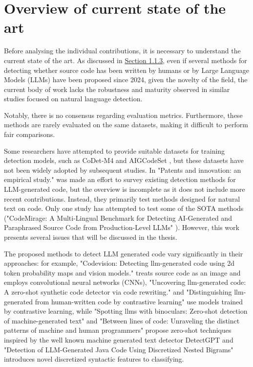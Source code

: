 \clearpage

\chapter{Overview of current state of the art}

Before analysing the individual contributions, 
it is necessary to understand the current state 
of the art. As discussed in
\hyperref[sec:Challenges in LLM-Generated Code Detection]{Section 1.1.3}, 
even if several methods for detecting whether source code has been written 
by humans or by Large Language Models (LLMs) have been proposed since 2024, 
given the novelty of the field, the current body of work lacks the 
robustness and maturity observed in similar studies focused on natural 
language detection. 

Notably, there is no consensus regarding evaluation 
metrics. Furthermore, these methods are rarely evaluated on the same datasets, 
making it difficult to perform fair comparisons.

Some researchers have attempted to provide suitable datasets for training 
detection models, such as CoDet-M4 \cite{orel2025codet,} and 
AIGCodeSet \cite{demirok2024aigcodeset}, but 
these datasets have not been widely adopted by subsequent studies. 
In "Patents and innovation: an empirical study." \cite{suh2024empirical} 
was made an effort to survey existing detection methods for 
LLM-generated code, but the overview is incomplete as it does not include 
more recent contributions. Instead, they primarily test methods designed for natural text on code.
Only one study has attempted to test some of the SOTA methods 
("CodeMirage: A Multi-Lingual Benchmark for Detecting AI-Generated and 
Paraphrased Source Code from Production-Level LLMs" \cite{guo2025codemirage}). 
However, this work presents several issues that 
will be discussed in the thesis.

The proposed methods to detect LLM generated code
vary significantly in their approaches: for example, 
"Codevision: Detecting llm-generated code using 2d token probability 
maps and vision models."\cite{xu2025codevision} treats 
source code as an image and employs convolutional neural networks (CNNs), 
"Uncovering llm-generated code: A zero-shot synthetic code detector via code rewriting."
\cite{ye2025uncovering} and 
"Distinguishing llm-generated from human-written code by contrastive learning" 
\cite{xu2025distinguishing} use models trained by contrastive learning, 
while "Spotting llms with binoculars: Zero-shot detection of machine-generated text" 
\cite{hans2024spotting}
and "Between lines of code: Unraveling the distinct patterns of machine and human programmers" 
\cite{shi2024between} propose zero-shot techniques inspired 
by the well known machine generated text detector DetectGPT\cite{mitchell2023detectgpt} 
and "Detection of LLM-Generated Java Code Using Discretized Nested Bigrams" \cite{paek2024detection}
introduces novel 
discretized syntactic features to classifying.

